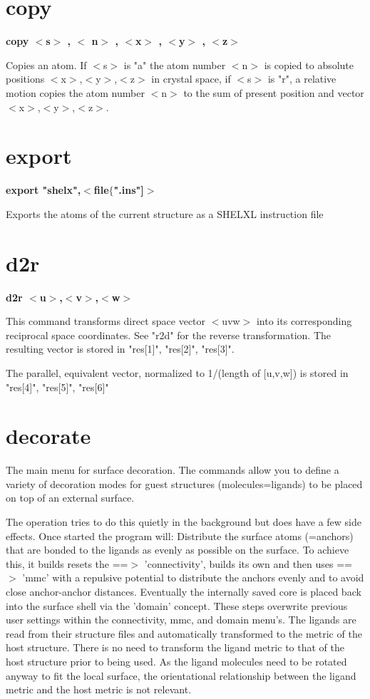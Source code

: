 \section{copy}
{\bf copy $ <$s$> $ , $ <$ n$> $ , $ <$x$> $ , $ <$y$> $ , $ <$z$> $ \par }
\par
\vspace{3pt}
Copies an atom. If $ <$s$> $ is "a" the atom number $ <$n$> $ is copied to 
absolute positions $ <$x$> $,$ <$y$> $,$ <$z$> $ in crystal space, if $ <$s$> $ is "r", a 
relative motion copies the atom number $ <$n$> $ to the sum of present 
position and vector $ <$x$> $,$ <$y$> $,$ <$z$> $. 
\section{export}
{\bf export "shelx",$ <$file$ \{$".ins"]$> $ \par }
\par
\vspace{3pt}
Exports the atoms of the current structure as a SHELXL instruction file 
\section{d2r}
{\bf d2r $ <$u$> $,$ <$v$> $,$ <$w$> $ \par }
\par
\vspace{3pt}
This command transforms direct space vector $ <$uvw$> $ into its corresponding 
reciprocal space coordinates. See "r2d" for the reverse transformation. 
The resulting vector is stored in "res[1]", "res[2]", "res[3]". 
\par
The parallel, equivalent vector, normalized to 1/(length of [u,v,w]) 
is stored in "res[4]", "res[5]", "res[6]" 
\section{decorate}
\par
The main menu for surface decoration. 
The commands allow you to define a variety of decoration modes for 
guest structures (molecules=ligands) to be placed on top of an external 
surface. 
\par
The operation tries to do this quietly in the background but does have 
a few side effects. Once started the program will: 
Distribute the surface atoms (=anchors) that are bonded to the ligands as 
evenly as possible on the surface. To achieve this, it builds resets the 
==$> $ 'connectivity', builds its own and then uses ==$> $ 'mmc' with a repulsive 
potential to distribute the anchors evenly and to avoid close anchor-anchor 
distances. Eventually the internally saved core is placed back into the 
surface shell via the 'domain' concept. These steps overwrite previous user 
settings within the connectivity, mmc, and domain menu's. 
The ligands are read from their structure files 
and automatically transformed to the metric of the host structure. There is 
no need to transform the ligand metric to that of the host structure prior 
to being used. As the ligand molecules need to be rotated anyway to fit the 
local surface, the orientational relationship between the ligand metric and 
the host metric is not relevant. 
\par
